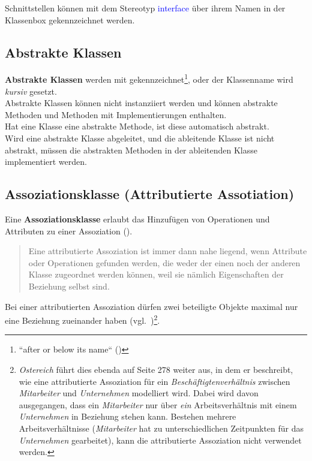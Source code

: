 \noindent
Schnittstellen können mit dem Stereotyp \textcolor{blue}{\guillemotleft interface\guillemotright} über ihrem Namen in der Klassenbox gekennzeichnet werden.

\subsection{Abstrakte Klassen}
\textbf{Abstrakte Klassen} werden mit  gekennzeichnet\footnote{
``after or below its name`` (\cite[101]{OMG17})
}, oder der Klassenname wird \textit{kursiv} gesetzt.\\
Abstrakte Klassen können nicht instanziiert werden und können abstrakte Methoden und Methoden mit Implementierungen enthalten.\\
Hat eine Klasse eine abstrakte Methode, ist diese automatisch abstrakt.\\
Wird eine abstrakte Klasse abgeleitet, und die ableitende Klasse ist nicht abstrakt, müssen die abstrakten Methoden in der ableitenden Klasse implementiert werden.

\subsection{Assoziationsklasse (Attributierte Assotiation)}
Eine \textbf{Assoziationsklasse} erlaubt das Hinzufügen von Operationen und Attributen zu einer Assoziation (\cite[43]{Buh09}).

\blockquote[{\cite[277]{Oes05}}]{
Eine attributierte Assoziation ist immer dann nahe liegend, wenn Attribute oder Operationen gefunden werden, die weder der einen noch der anderen Klasse zugeordnet werden können, weil sie nämlich Eigenschaften der Beziehung selbst sind.
}.

\begin{tcolorbox}
Bei einer attributierten Assoziation dürfen zwei beteiligte Objekte maximal nur eine Beziehung zueinander haben (vgl.~\cite[277]{Oes05})\footnote{
\textit{Ostereich} führt dies ebenda auf Seite 278 weiter aus, in dem er beschreibt, wie eine attributierte Assoziation für ein \textit{Beschäftigtenverhältnis} zwischen \textit{Mitarbeiter} und \textit{Unternehmen} modelliert wird. Dabei wird davon ausgegangen, dass ein \textit{Mitarbeiter} nur über \textit{ein} Arbeitsverhältnis mit einem \textit{Unternehmen} in Beziehung stehen kann. Bestehen mehrere Arbeitsverhältnisse (\textit{Mitarbeiter} hat zu unterschiedlichen Zeitpunkten für das \textit{Unternehmen} gearbeitet), kann die attributierte Assoziation nicht verwendet werden.
}.
\end{tcolorbox}


